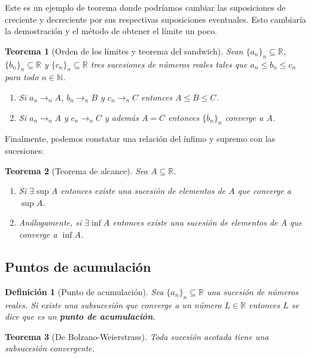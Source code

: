 \documentclass{article}
\newtheorem{theorem}{Teorema}
\newtheorem{define}{Definición}
\newcommand{\reales}{\mathbb{R}}
\newcommand{\naturales}{\mathbb{N}}
\newcommand{\sucesion}[1]{\{ #1 _n \}_n}
\newcommand{\sucreal}[1]{\{ #1 _n \}_n \subseteq \reales}
\newcommand{\converge}[2]{#1 _n \rightarrow_{n} #2}
\begin{document}
Este es un ejemplo de teorema donde podríamos cambiar las suposiciones de creciente y decreciente por sus respectivas suposiciones eventuales. Esto cambiaría la demostración y el método de obtener el límite un poco.

\begin{theorem}[Orden de los límites y teorema del sandwich]
Sean $\sucreal{a}$, $\sucreal{b}$ y $\sucreal{c}$ tres sucesiones de números reales tales que $a_n \leq b_n \leq c_n$ para todo $n \in \naturales$.
\begin{enumerate}
\item
Si $\converge{a}{A}$, $\converge{b}{B}$ y $\converge{c}{C}$ entonces $A \leq B \leq C$.
\item
Si $\converge{a}{A}$ y $\converge{c}{C}$ y además $A = C$ entonces $\sucesion{b}$ converge a $A$.
\end{enumerate}
\end{theorem}

Finalmente, podemos constatar una relación del ínfimo y supremo con las sucesiones:

\begin{theorem}[Teorema de alcance]
	Sea $A \subseteq \reales$. 
\begin{enumerate}
\item
	Si $\exists \sup A$ entonces existe una sucesión de elementos de $A$ que converge a $\sup A$.
\item
	Análogamente, si $\exists \inf A$ entonces existe una sucesión de elementos de $A$ que converge a $\inf A$.
\end{enumerate}	

\end{theorem}







\subsection{Puntos de acumulación}
\begin{define}[Punto de acumulación]
	Sea $\sucreal{a}$ una sucesión de números reales. Si existe una subsucesión que converge a un número $L \in \reales$ entonces $L$ se dice que es un \textbf{punto de acumulación}.
\end{define}

\begin{theorem}[De Bolzano-Weierstrass]
\label{thm_bolzano_weierstrass}
	Toda sucesión acotada tiene una subsucesión convergente.
\end{theorem}
\end{document}
